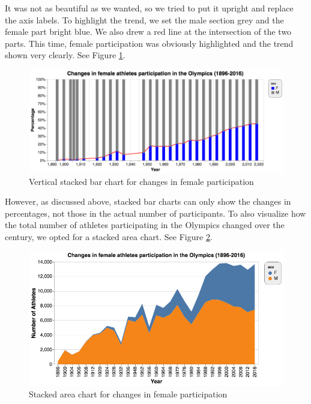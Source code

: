 \documentclass[
]{article}
\begin{document}
It was not as beautiful as we wanted, so we tried to put it upright and replace the axis labels. To highlight the trend, we set the male section grey and the female part bright blue. We also drew a red line at the intersection of the two parts. This time, female participation was obviously highlighted and the trend shown very clearly. See Figure \ref{fig:figure23}.

\begin{figure}

{\centering \includegraphics[width=1\linewidth]{static/pics/g-1-3} 

}

\caption{Vertical stacked bar chart for changes in female participation}\label{fig:figure23}
\end{figure}

However, as discussed above, stacked bar charts can only show the changes in percentages, not those in the actual number of participants. To also visualize how the total number of athletes participating in the Olympics changed over the century, we opted for a stacked area chart. See Figure \ref{fig:figure24}.

\begin{figure}

{\centering \includegraphics[width=1\linewidth]{static/pics/g-1-4_new} 

}

\caption{Stacked area chart for changes in female participation}\label{fig:figure24}
\end{figure}
\end{document}
